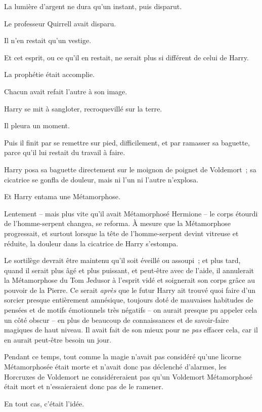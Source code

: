 La lumière d'argent ne dura qu'un instant, puis disparut.

Le professeur Quirrell avait disparu.

Il n'en restait qu'un vestige.

Et cet esprit, ou ce qu'il en restait, ne serait plus si différent de celui de Harry.

La prophétie était accomplie.

Chacun avait refait l'autre à son image.

Harry se mit à sangloter, recroquevillé sur la terre.

Il pleura un moment.

Puis il finit par se remettre sur pied, difficilement, et par ramasser sa baguette, parce qu'il lui restait du travail à faire.

\later

Harry posa sa baguette directement sur le moignon de poignet de Voldemort~; sa cicatrice se gonfla de douleur, mais ni l'un ni l'autre n'explosa.

Et Harry entama une Métamorphose.

Lentement -- mais plus vite qu'il avait Métamorphosé Hermione -- le corps étourdi de l'homme-serpent changea, se reforma.
À mesure que la Métamorphose progressait, et surtout lorsque la tête de l'homme-serpent devint vitreuse et réduite, la douleur dans la cicatrice de Harry s'estompa.

Le sortilège devrait être maintenu qu'il soit éveillé ou assoupi~; et plus tard, quand il serait plus âgé et plus puissant, et peut-être avec de l'aide, il annulerait la Métamorphose du Tom Jedusor à l'esprit vidé et soignerait son corps grâce au pouvoir de la Pierre.
Ce serait \emph{après} que le futur Harry ait trouvé quoi faire d'un sorcier presque entièrement amnésique, toujours doté de mauvaises habitudes de pensées et de motifs émotionnels très négatifs -- on aurait presque pu appeler cela un côté obscur -- en plus de beaucoup de connaissances et de savoir-faire magiques de haut niveau.
Il avait fait de son mieux pour ne \emph{pas} effacer cela, car il en aurait peut-être besoin un jour.

Pendant ce temps, tout comme la magie n'avait pas considéré qu'une licorne Métamorphosée était morte et n'avait donc pas déclenché d'alarmes, les Horcruxes de Voldemort ne considéreraient pas qu'un Voldemort Métamorphosé était mort et n'essaieraient donc pas de le ramener.

En tout cas, c'était l'idée.

